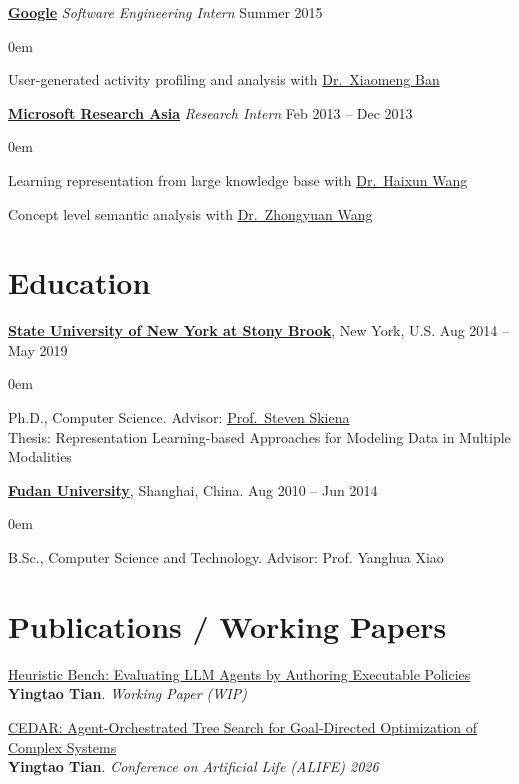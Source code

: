 \documentclass[line,margin]{cv}
\newenvironment{block}
{
  \begin{addmargin}[2em]{0em}%
}
{
  \end{addmargin}
}
\newcommand{\SUNY}{\href{http://www.stonybrook.edu/}{State University of New York at Stony Brook}}
\newcommand{\Google}{\href{https://www.google.com/}{Google}}
\newcommand{\Fudan}{\href{https://www.fudan.edu.cn/en/}{Fudan University}}
\newcommand{\MSRA}{\href{http://research.microsoft.com/en-us/labs/asia/default.aspx}{Microsoft Research Asia}}
\newcommand{\Haixun}{\href{http://haixun.olidu.com/}{Dr.\ Haixun Wang}}
\newcommand{\Zhongyuan}{\href{http://www.wangzhongyuan.com/}{Dr.\ Zhongyuan Wang}}
\newcommand{\Xiaomeng}{\href{https://www.linkedin.com/in/xiaomengban/}{Dr.\ Xiaomeng Ban}}
\newcommand{\Skiena}{\href{https://www3.cs.stonybrook.edu/~skiena/}{Prof.\ Steven Skiena}}
\begin{document}
\begin{resume}
  {\bf \Google} {\itshape Software Engineering Intern} \hfill Summer 2015
  \begin{block}
    User-generated activity profiling and analysis with \Xiaomeng
  \end{block}

  {\bf \MSRA} {\itshape Research Intern} \hfill Feb 2013 -- Dec 2013

  \begin{block}
    Learning representation from large knowledge base with \Haixun

    Concept level semantic analysis with \Zhongyuan
  \end{block}

\section{Education}

  {\bf \SUNY}, New York, U.S. \hfill Aug 2014 -- May 2019
  \begin{block}
    Ph.D., Computer Science. Advisor: \Skiena{} \\
    Thesis: Representation Learning-based Approaches for Modeling Data in Multiple Modalities
  \end{block}

  {\bf \Fudan}, Shanghai, China. \hfill Aug 2010 -- Jun 2014

  \begin{block}
    B.Sc., Computer Science and Technology. Advisor: Prof. Yanghua Xiao
  \end{block}


\section{Publications / Working Papers}
{\small
\setlength{\emergencystretch}{1em}
\setlength{\parskip}{0.5ex plus 0.1ex minus 0.1ex}

  \begin{samepage}
  \href{https://alantian.net/pub/tian2026heuristics/paper.pdf}{Heuristic Bench: Evaluating LLM Agents by Authoring Executable Policies}\\
  \textbf{Yingtao Tian}. \emph{Working Paper (WIP)}
  \par\end{samepage}

  \begin{samepage}
  \href{https://arxiv.org/abs/2608.06871}{CEDAR: Agent-Orchestrated Tree Search for Goal-Directed Optimization of Complex Systems}\\
  \textbf{Yingtao Tian}. \emph{Conference on Artificial Life (ALIFE) 2026}
  \par\end{samepage}

}
\end{resume}
\end{document}
